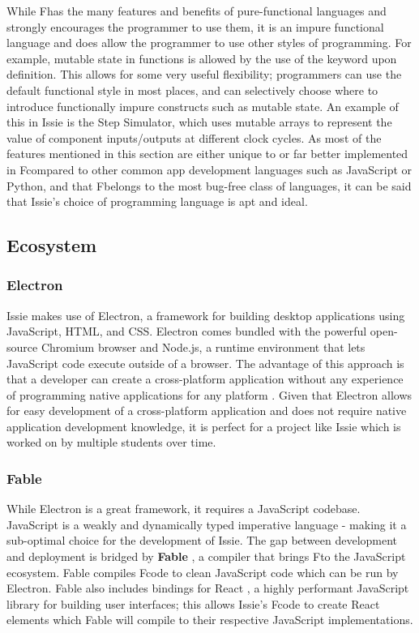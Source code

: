 While F\fsharp has the many features and benefits of pure-functional languages and strongly encourages the programmer to use them, it is an impure functional language and does allow the programmer to use other styles of programming. For example, mutable state in functions is allowed by the use of the  keyword upon definition. This allows for some very useful flexibility; programmers can use the default functional style in most places, and can selectively choose where to introduce functionally impure constructs such as mutable state. An example of this in Issie is the Step Simulator, which uses mutable arrays to represent the value of component inputs/outputs at different clock cycles.
As most of the features mentioned in this section are either unique to or far better implemented in F\fsharp compared to other common app development languages such as JavaScript or Python, and that F\fsharp belongs to the most bug-free class of languages, it can be said that Issie's choice of programming language is apt and ideal.

\subsection{Ecosystem} \label{subsec:ecosystem}
\subsubsection{Electron}
Issie makes use of Electron, a framework for building desktop applications using JavaScript, HTML, and CSS. Electron comes bundled with the powerful open-source Chromium browser and Node.js, a runtime environment that lets JavaScript code execute outside of a browser. The advantage of this approach is that a developer can create a cross-platform application without any experience of programming native applications for any platform \cite{electrondocs}. Given that Electron allows for easy development of a cross-platform application and does not require native application development knowledge, it is perfect for a project like Issie which is worked on by multiple students over time. 

\subsubsection{Fable}
While Electron is a great framework, it requires a JavaScript codebase. JavaScript is a weakly and dynamically typed imperative language - making it a sub-optimal choice for the development of Issie. The gap between development and deployment is bridged by \textbf{Fable} \cite{fableio}, a compiler that brings F\fsharp to the JavaScript ecosystem. Fable compiles F\fsharp code to clean JavaScript code which can be run by Electron. Fable also includes bindings for React \cite{reactjs}, a highly performant JavaScript library for building user interfaces; this allows Issie's F\fsharp code to create React elements which Fable will compile to their respective JavaScript implementations.

